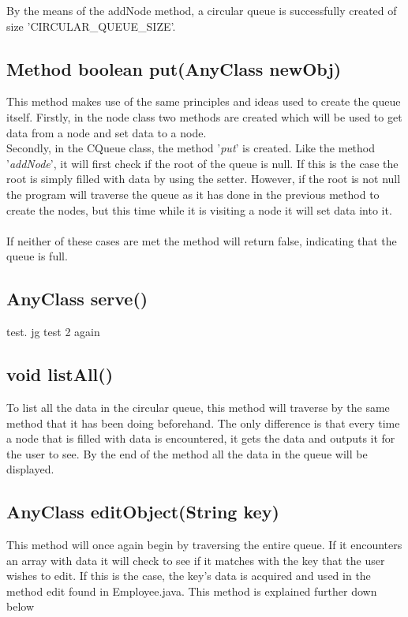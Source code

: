 \documentclass[a4paper]{article}
\begin{document}
By the means of the addNode method, a circular queue is successfully created of size 'CIRCULAR\_QUEUE\_SIZE'.
\bigskip

\subsection{Method boolean put(AnyClass newObj)}
This method makes use of the same principles and ideas used to create the queue itself. Firstly, in the node class two methods are created which will be used to get data from a node and set data to a node.
\\Secondly, in the CQueue class, the method '\emph{put}' is created. Like the method '\emph{addNode}', it will first check if the root of the queue is null. If this is the case the root is simply filled with data by using the setter. However, if the root is not null the program will traverse the queue as it has done in the previous method to create the nodes, but this time while it is visiting a node it will set data into it.\\
\\If neither of these cases are met the method will return false, indicating that the queue is full.
\bigskip

\subsection{AnyClass serve()}
test. jg
test 2 again
\bigskip

\subsection{void listAll()}
To list all the data in the circular queue, this method will traverse by the same method that it has been doing beforehand. The only difference is that every time a node that is filled with data is encountered, it gets the data and outputs it for the user to see. By the end of the method all the data in the queue will be displayed.\\
\bigskip

\subsection{AnyClass editObject(String key)}
This method will once again begin by traversing the entire queue. If it encounters an array with data it will check to see if it matches with the key that the user wishes to edit. If this is the case, the key's data is acquired and used in the method edit found in Employee.java. This method is explained further down below
\bigskip
\end{document}
